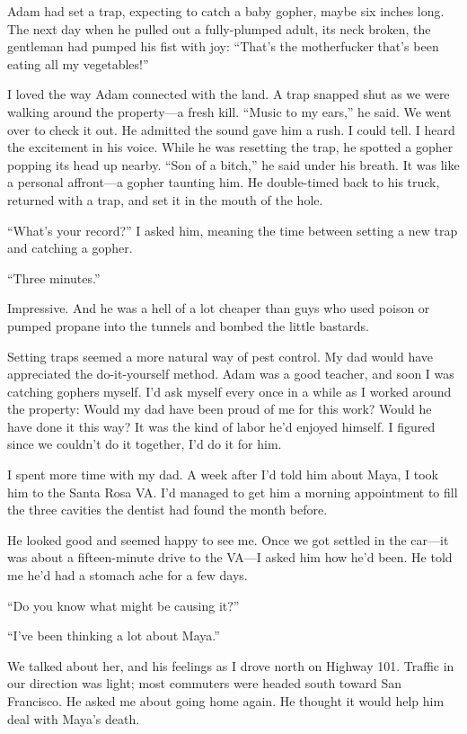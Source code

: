 \documentclass[12pt]{book}
\begin{document}
Adam had set a trap, expecting to catch a baby gopher, maybe six inches long. The next day when he pulled out a fully-plumped adult, its neck broken, the gentleman had pumped his fist with joy: ``That's the motherfucker that's been eating all my vegetables!''

I loved the way Adam connected with the land. A trap snapped shut as we were walking around the property---a fresh kill. ``Music to my ears,'' he said. We went over to check it out. He admitted the sound gave him a rush. I could tell. I heard the excitement in his voice. While he was resetting the trap, he spotted a gopher popping its head up nearby. ``Son of a bitch,'' he said under his breath. It was like a personal affront---a gopher taunting him. He double-timed back to his truck, returned with a trap, and set it in the mouth of the hole.

``What's your record?'' I asked him, meaning the time between setting a new trap and catching a gopher.

``Three minutes.''

Impressive. And he was a hell of a lot cheaper than guys who used poison or pumped propane into the tunnels and bombed the little bastards.

Setting traps seemed a more natural way of pest control. My dad would have appreciated the do-it-yourself method. Adam was a good teacher, and soon I was catching gophers myself. I'd ask myself every once in a while as I worked around the property: Would my dad have been proud of me for this work? Would he have done it this way? It was the kind of labor he'd enjoyed himself. I figured since we couldn't do it together, I'd do it for him.

I spent more time with my dad. A week after I'd told him about Maya, I took him to the Santa Rosa VA. I'd managed to get him a morning appointment to fill the three cavities the dentist had found the month before.

He looked good and seemed happy to see me. Once we got settled in the car---it was about a fifteen-minute drive to the VA---I asked him how he'd been. He told me he'd had a stomach ache for a few days.

``Do you know what might be causing it?''

``I've been thinking a lot about Maya.''

We talked about her, and his feelings as I drove north on Highway 101. Traffic in our direction was light; most commuters were headed south toward San Francisco. He asked me about going home again. He thought it would help him deal with Maya's death.
\end{document}
